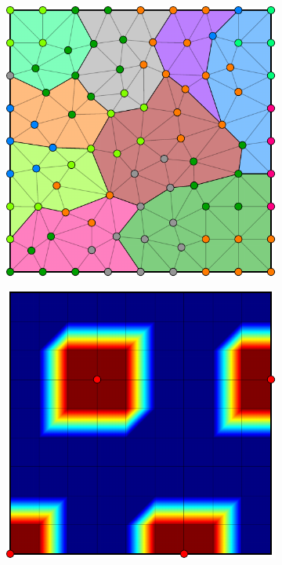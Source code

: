 \begin{figure}[htbp]
\begin{subfigure}[t]{0.3\textwidth}
  \end{subfigure}
  \hfill
  \begin{subfigure}[t]{0.3\textwidth}
    \centerline{\includegraphics[width=0.9\linewidth]{figs/square_tria_metis_node_part}}
  \end{subfigure}
  \par\bigskip
  \begin{subfigure}[t]{0.3\textwidth}
    \centerline{\includegraphics[width=0.9\linewidth]{figs/square_cart_struct_node_init}}

\end{subfigure}
\end{figure}
